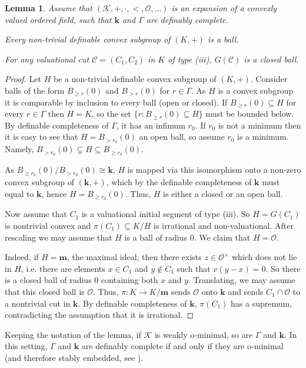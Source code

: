 \documentclass[11pt]{amsart}
\newtheorem{lemma}[theorem]{Lemma}
\theoremstyle{definition}
\newcommand{\m}{\textbf{m}}
\newcommand{\bk}{\textbf{k}}
\newcommand{\CK}{{\mathcal K}}
\newcommand{\CC}{{\mathcal C}}
\newcommand{\CO}{{\mathcal O}}
\newcommand{\0}{\emptyset}
\def\sub{\subseteq}
\begin{document}
\begin{lemma}\label{L: o-minimal group and res}
	Assume that $(\CK,+,\cdot,<,\CO,\dots)$ is an expansion of a convexly valued ordered field, such that 
	$\bk$ and $\Gamma$ are definably complete.
   
	Every non-trivial definable convex subgroup of $(K,+)$ is a ball.  
    
    For any valuational cut $\CC=(C_1,C_2)$ in $K$ of type (iii), $G(\CC)$ is a closed ball.
\end{lemma} 
\begin{proof}
    Let $H$ be a non-trivial definable convex subgroup of $(K,+)$. Consider balls of the form $B_{\geq r}(0)$ and $B_{>r}(0)$ for $r\in \Gamma$. As $H$ is a convex subgroup it is comparable by inclusion to every ball (open or closed).  If $B_{\geq r}(0)\subseteq H$ for every $r\in \Gamma$ then $H=K$, so the set  $\{r:B_{\geq r}(0)\sub H\}$ must be bounded below. By definable completeness of $\Gamma$, it has an infimum $r_0$.
    If $r_0$ is not a  minimum then it is easy to see that $H=B_{>r_0}(0)$ an open ball, so assume $r_0$ is a minimum. Namely, $B_{>r_0}(0)\subsetneq H\subseteq B_{\geq r_0}(0)$.

     As $B_{\ge r_0}(0)/ B_{> r_0}(0)\cong \bk$, $H$ is mapped via this isomorphism onto a non-zero convex subgroup of $(\bk, +)$, which by the definable completeness of $\bk$ must equal to $\bk$, hence   $H=B_{\geq r_0}(0)$. Thus, $H$ is either a closed or an open ball.

	Now assume that $C_1$ is a valuational initial segment of type (iii). So $H=G(C_1)$ is nontrivial convex and $\pi(C_1)\subseteq K/H$ is irrational and non-valuational. After rescaling we may assume that $H$ is a ball of radius $0$. We claim that $H=\CO$. 
    
    Indeed, if $H=\m$, the maximal ideal, then there exists $z\in \CO^\times$ which does not lie in $H$, i.e. there are elements $x\in C_1$ and $y\notin C_1$ such that $v(y-x)=0$. So there is a closed ball of radius $0$  containing both $x$ and $y$. Translating, we may assume that this closed ball is $\CO$. Thus, $\pi:K\to K/\m$ sends $\CO$ onto $\bk$ and sends $C_1\cap \CO$ to a nontrivial cut in $\bk$. By definable completeness of $\bk$, $\pi(C_1)$ has a supremum, contradicting the assumption that it is irrational.
\end{proof}    

Keeping the notation of the lemma, if $\CK$ is weakly o-minimal, so are $\Gamma$ and $\bk$. In this setting, $\Gamma$ and $\bk$ are definably complete if and only if they are o-minimal (and therefore stably embedded, see \cite{HaOn2a}).
\end{document}
